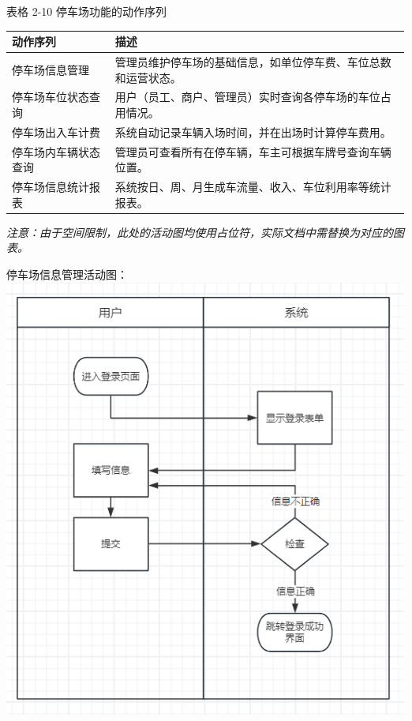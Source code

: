 \documentclass[]{article}
\begin{document}
表格 2-10 停车场功能的动作序列
\begin{longtable}[]{@{}ll@{}}
\toprule
动作序列 & 描述\tabularnewline
\midrule
\endhead
停车场信息管理 & 管理员维护停车场的基础信息，如单位停车费、车位总数和运营状态。\tabularnewline
停车场车位状态查询 & 用户（员工、商户、管理员）实时查询各停车场的车位占用情况。\tabularnewline
停车场出入车计费 & 系统自动记录车辆入场时间，并在出场时计算停车费用。\tabularnewline
停车场内车辆状态查询 & 管理员可查看所有在停车辆，车主可根据车牌号查询车辆位置。\tabularnewline
停车场信息统计报表 & 系统按日、周、月生成车流量、收入、车位利用率等统计报表。\tabularnewline
\bottomrule
\end{longtable}

\textit{注意：由于空间限制，此处的活动图均使用占位符，实际文档中需替换为对应的图表。}

停车场信息管理活动图：
\includegraphics{media/media/image1.png}
\end{document}
